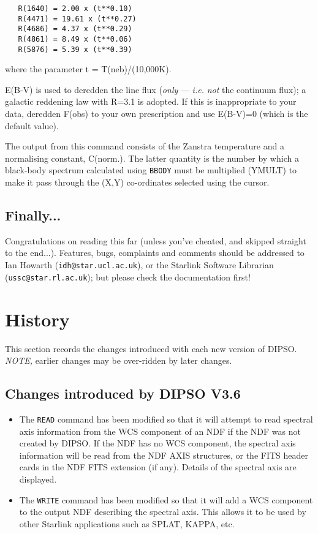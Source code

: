 \documentclass[twoside,11pt]{article}
\newcommand{\htmlref}[2]{#1}
\renewcommand{\_}{\texttt{\symbol{95}}}
\begin{document}
\begin {description}
\begin{verbatim}
   R(1640) = 2.00 x (t**0.10)
   R(4471) = 19.61 x (t**0.27)
   R(4686) = 4.37 x (t**0.29)
   R(4861) = 8.49 x (t**0.06)
   R(5876) = 5.39 x (t**0.39)
\end{verbatim}

where the parameter t = T(neb)/(10,000K).

E(B-V) is used to deredden the line flux ({\em only} --- {\em i.e.}
{\em not} the continuum flux); a galactic reddening law with R=3.1 is
adopted. If this is inappropriate to your data, deredden F(obs) to
your own prescription and use E(B-V)=0 (which is the default value).

The output from this command consists of the Zanstra temperature and a
normalising constant, C(norm.). The latter quantity is the number by
which a black-body spectrum calculated using \htmlref{{\tt{BBODY}}}{COM:BBODY}  must be multiplied
(YMULT) to make it pass through the (X,Y) co-ordinates selected using
the cursor.

\end{description}

\subsection{Finally...}
Congratulations on reading this far (unless you've cheated, and skipped
straight to the end...). Features, bugs, complaints and comments should
be addressed to Ian Howarth ({\tt{idh@star.ucl.ac.uk}}),  or the Starlink
Software Librarian ({\tt{ussc@star.rl.ac.uk}});  but please check the
documentation first!

\newpage

\section{\label{APP:HISTORY}History}


This section records the changes introduced with each new version of DIPSO.
{\em NOTE,} earlier changes may be over-ridden by later changes.

\subsection{Changes introduced by DIPSO V3.6}
\begin{itemize}
\item The {\tt READ} command has been modified so that it will attempt to
read spectral axis information from the WCS component of an NDF if the NDF
was not created by DIPSO. If the NDF has no WCS component, the spectral
axis information will be read from the NDF AXIS structures, or the FITS header 
cards in the NDF FITS extension (if any). Details of the spectral axis are 
displayed.
\item The {\tt WRITE} command has been modified so that it will add a WCS
component to the output NDF describing the spectral axis. This allows it
to be used by other Starlink applications such as SPLAT, KAPPA, etc.
\end{itemize}
\end{document}
